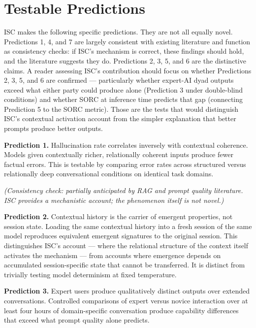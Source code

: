 \documentclass[12pt]{article}
\begin{document}
\bigskip

\section{Testable Predictions}\label{testable-predictions}

ISC makes the following specific predictions. They are not all equally novel. Predictions 1, 4, and 7 are largely consistent with existing literature and function as consistency checks: if ISC's mechanism is correct, these findings should hold, and the literature suggests they do. Predictions 2, 3, 5, and 6 are the distinctive claims. A reader assessing ISC's contribution should focus on whether Predictions 2, 3, 5, and 6 are confirmed --- particularly whether expert-AI dyad outputs exceed what either party could produce alone (Prediction 3 under double-blind conditions) and whether SORC at inference time predicts that gap (connecting Prediction 5 to the SORC metric). Those are the tests that would distinguish ISC's contextual activation account from the simpler explanation that better prompts produce better outputs.

\textbf{Prediction 1.} Hallucination rate correlates inversely with
contextual coherence. Models given contextually richer, relationally
coherent inputs produce fewer factual errors. This is testable by
comparing error rates across structured versus relationally deep
conversational conditions on identical task domains.

\textit{(Consistency check: partially anticipated by RAG and prompt quality literature. ISC provides a mechanistic account; the phenomenon itself is not novel.)}

\textbf{Prediction 2.} Contextual history is the carrier of emergent
properties, not session state. Loading the same contextual history into
a fresh session of the same model reproduces equivalent emergent
signatures to the original session. This distinguishes ISC's account ---
where the relational structure of the context itself activates the
mechanism --- from accounts where emergence depends on accumulated
session-specific state that cannot be transferred. It is distinct from
trivially testing model determinism at fixed temperature.

\textbf{Prediction 3.} Expert users produce qualitatively distinct
outputs over extended conversations. Controlled comparisons of expert
versus novice interaction over at least four hours of domain-specific
conversation produce capability differences that exceed what prompt
quality alone predicts.
\end{document}
